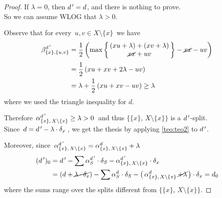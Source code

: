 \documentclass[./main.tex]{subfiles}
\begin{document}
\begin{proof}
    If $\lambda = 0$, then ${d^{\,\prime}} = d$, and there is nothing to prove. \\
    So we can assume WLOG that $\lambda > 0$.
    
    Observe that for every $\, u,v \in X \setminus \{x\} \,$ we have
    \begin{align*}
        \beta_{\{x\},\{u,v\}}^{d^{\,\prime}} &= \frac{1}{2}\, \biggl( \max {\biggl\{\!\!
            \begin{array}{c}
                (xu + \lambda) + (xv + \lambda) \\
                \cancel{xx} + uv
            \end{array}
        \!\!\biggr\}} - \cancel{xx} - uv \biggr) \\[2pt]
        &= \frac{1}{2}\, (xu + xv + 2 \lambda - uv) \\
        &= \lambda + \frac{1}{2}\, (xu + xv - uv) \geq \lambda
    \end{align*}
    where we used the triangle inequality for $d$.

    Therefore $\, \alpha_{\{x\},\, X \setminus \{x\}}^{d^{\,\prime}} \geq \lambda > 0 \,$ and thus $\bigl\{ \{x\},\, X \setminus \{x\} \bigr\}$ is a ${d^{\,\prime}}$-split. \\[3pt]
    Since $\, d = {d^{\,\prime}} - \lambda \cdot \delta_x \,$, we get the thesis by applying \autoref{teo:teo2} to ${d^{\,\prime}}$.

    Moreover, since $\, \alpha_{\{x\},\, X \setminus \{x\}}^{d^{\,\prime}} = \alpha_{\{x\},\, X \setminus \{x\}}^d + \lambda \,$
    \begin{align*}
        ({d^{\,\prime}})_0 &= {d^{\,\prime}} - \sum{\alpha_S^{d^{\,\prime}}\cdot \delta_S} - \alpha_{\{x\},\, X \setminus \{x\}}^{d^{\,\prime}} \cdot \delta_x \\
        &= (d + \cancel{\lambda \cdot \delta_x}) - \sum{\alpha_S^d \cdot \delta_S} - \bigl(\, \alpha_{\{x\},\, X \setminus \{x\}}^d \,\cancel{+ \lambda} \,\bigr) \cdot \delta_x = d_0
    \end{align*}
    where the sums range over the splits different from $\bigl\{ \{x\},\, X \setminus \{x\} \bigr\}$. \qedhere
\end{proof}
\end{document}
